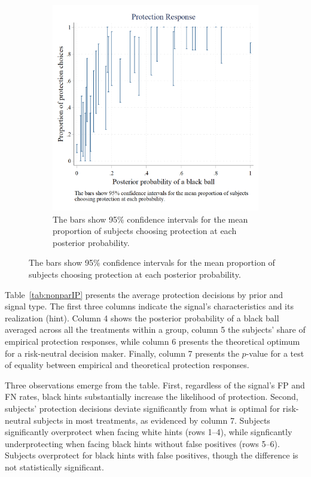 \documentclass[12pt,a4paper]{article}
\newcommand{\aut}[1]{{\color{Red}#1}}
\newcommand{\pmt}[1]{{\color{Blue}#1}}
\begin{document}
\begin{figure}[H]
\begin{subfigure}[t]{.45\textwidth}
  \includegraphics[width=\textwidth]{Graphs/ip_response.png}
\caption{The bars show 95\% confidence intervals for the mean proportion of subjects choosing protection at each posterior probability.}
\end{subfigure}
%
\end{figure}

Table~\ref{tab:nonparIP} presents the average protection decisions by prior and signal type. \aut{The first three columns indicate the signal's characteristics and its realization (hint).} Column 4 shows the posterior probability of a black ball averaged across all the treatments within a group, column 5 the subjects' share of empirical protection responses, while column 6 presents the theoretical optimum for a risk-neutral decision maker. Finally, column 7 presents the $p$-value for a test of equality between empirical and theoretical protection responses.

Three observations emerge from the table. First, regardless of the signal's FP and FN rates, black hints substantially increase the likelihood of protection.  Second, subjects' protection decisions deviate significantly from what is optimal for risk-neutral subjects in most treatments, as evidenced by column 7. Subjects significantly overprotect when facing white hints (rows 1--4), while signficantly underprotecting when facing black hints without false positives (rows 5--6).  Subjects overprotect for black hints with false positives, though the difference is not statistically significant. 
\end{document}
